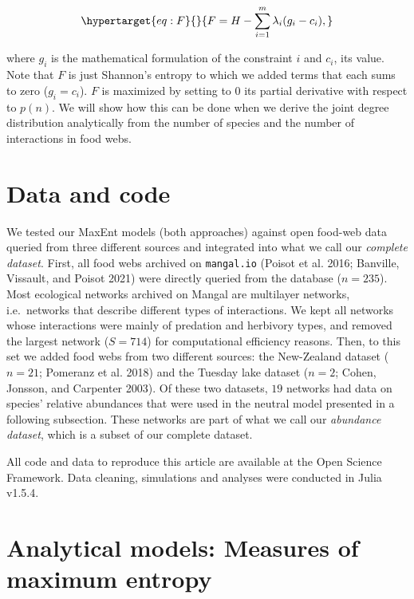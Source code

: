 \documentclass[10pt,oneside]{article}
\begin{document}
\begin{equation}\protect\hypertarget{eq:F}{}{F = H - \sum_{i=1}^m \lambda_i (g_i-c_i),}\label{eq:F}\end{equation}

where \(g_i\) is the mathematical formulation of the constraint \(i\)
and \(c_i\), its value. Note that \(F\) is just Shannon's entropy to
which we added terms that each sums to zero (\(g_i = c_i\)). \(F\) is
maximized by setting to \(0\) its partial derivative with respect to
\(p(n)\). We will show how this can be done when we derive the joint
degree distribution analytically from the number of species and the
number of interactions in food webs.

\hypertarget{data-and-code}{%
\section{Data and code}\label{data-and-code}}

We tested our MaxEnt models (both approaches) against open food-web data
queried from three different sources and integrated into what we call
our \emph{complete dataset}. First, all food webs archived on
\texttt{mangal.io} (Poisot et al. 2016; Banville, Vissault, and Poisot
2021) were directly queried from the database (\(n = 235\)). Most
ecological networks archived on Mangal are multilayer networks,
i.e.~networks that describe different types of interactions. We kept all
networks whose interactions were mainly of predation and herbivory
types, and removed the largest network (\(S = 714\)) for computational
efficiency reasons. Then, to this set we added food webs from two
different sources: the New-Zealand dataset (\(n = 21\); Pomeranz et al.
2018) and the Tuesday lake dataset (\(n = 2\); Cohen, Jonsson, and
Carpenter 2003). Of these two datasets, \(19\) networks had data on
species' relative abundances that were used in the neutral model
presented in a following subsection. These networks are part of what we
call our \emph{abundance dataset}, which is a subset of our complete
dataset.

All code and data to reproduce this article are available at the Open
Science Framework. Data cleaning, simulations and analyses were
conducted in Julia v1.5.4.

\hypertarget{analytical-models-measures-of-maximum-entropy}{%
\section{Analytical models: Measures of maximum
entropy}\label{analytical-models-measures-of-maximum-entropy}}
\end{document}
